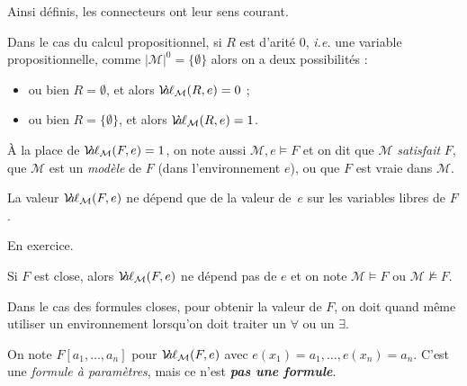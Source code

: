 \documentclass[./main]{subfiles}
\begin{document}
  \begin{rmk}
    Ainsi définis, les connecteurs ont leur sens courant.

    Dans le cas du calcul propositionnel, si $R$ est d'arité $0$, \textit{i.e.} une variable propositionnelle, comme $|\mathcal{M}|^0 = \{\emptyset\}$ alors on a deux possibilités :
    \begin{itemize}
      \item ou bien $R = \emptyset$, et alors $\mathcal{V}\hspace{-3.5pt}a\hspace{-0.5pt}\ell_{\mathcal{M}}(R, e) = 0$ ;
      \item ou bien $R = \{\emptyset\} $, et alors $\mathcal{V}\hspace{-3.5pt}a\hspace{-0.5pt}\ell_{\mathcal{M}}(R, e) = 1$.
    \end{itemize}
  \end{rmk}

  \begin{nota}
    À la place de $\mathcal{V}\hspace{-3.5pt}a\hspace{-0.5pt}\ell_{\mathcal{M}}(F, e) = 1$, on note aussi $\mathcal{M}, e \models F$ et
    on dit que $\mathcal{M}$ \textit{satisfait} $F$, que $\mathcal{M}$ est un \textit{modèle} de $F$ (dans l'environnement $e$), ou que $F$ est vraie dans $\mathcal{M}$.
  \end{nota}

  \begin{lem}
    La valeur $\mathcal{V}\hspace{-3.5pt}a\hspace{-0.5pt}\ell_{\mathcal{M}}(F, e)$ ne dépend que de la valeur de~$e$ sur les variables libres de $F$.
  \end{lem}
  \begin{prv}
    En exercice.
  \end{prv}

  \begin{crlr}
    Si $F$ est close, alors $\mathcal{V}\hspace{-3.5pt}a\hspace{-0.5pt}\ell_{\mathcal{M}}(F, e)$ ne dépend pas de $e$ et on note $\mathcal{M} \models F$ ou $\mathcal{M} \not\models F$.
  \end{crlr}

  \begin{rmk}
    Dans le cas des formules closes, pour obtenir la valeur de $F$, on doit quand même utiliser un environnement lorsqu'on doit traiter un $\forall $ ou un $\exists$.
  \end{rmk}

  \begin{nota}
    On note $F[a_1, \ldots, a_n]$ pour $\mathcal{V}\hspace{-3.5pt}a\hspace{-0.5pt}\ell_{\mathcal{M}}(F, e)$ avec $e(x_1) = a_1, \ldots, e(x_n) = a_n$.
    C'est une \textit{formule à paramètres}, mais ce n'est \textit{\textbf{pas une formule}}.
  \end{nota}
\end{document}
